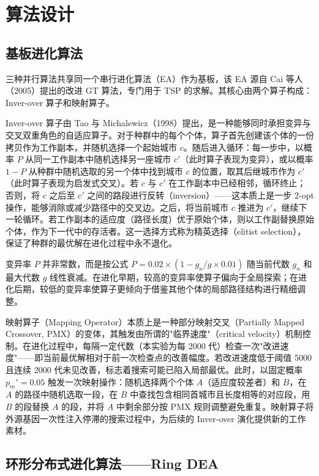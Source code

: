 \section{算法设计}

\subsection{基板进化算法}

三种并行算法共享同一个串行进化算法（EA）作为基板，该 EA 源自 Cai 等人（2005）提出的改进 GT 算法，专门用于 TSP 的求解。其核心由两个算子构成：Inver-over 算子和映射算子。

Inver-over 算子由 Tao 与 Michalewicz（1998）提出，是一种能够同时承担变异与交叉双重角色的自适应算子。对于种群中的每个个体，算子首先创建该个体的一份拷贝作为工作副本，并随机选择一个起始城市 $c$。随后进入循环：每一步中，以概率 $P$ 从同一工作副本中随机选择另一座城市 $c'$（此时算子表现为变异），或以概率 $1-P$ 从种群中随机选取的另一个体中找到城市 $c$ 的位置，取其后继城市作为 $c'$（此时算子表现为启发式交叉）。若 $c$ 与 $c'$ 在工作副本中已经相邻，循环终止；否则，将 $c$ 之后至 $c'$ 之间的路段进行反转（inversion）——这本质上是一步 2-opt 操作，能够消除或减少路径中的交叉边。之后，将当前城市 $c$ 推进为 $c'$，继续下一轮循环。若工作副本的适应度（路径长度）优于原始个体，则以工作副替换原始个体，作为下一代中的存活者。这一选择方式称为精英选择（elitist selection），保证了种群的最优解在进化过程中永不退化。

变异率 $P$ 并非常数，而是按公式 $P = 0.02 \times (1 - g_n / g \times 0.01)$ 随当前代数 $g_n$ 和最大代数 $g$ 线性衰减。在进化早期，较高的变异率使算子偏向于全局探索；在进化后期，较低的变异率使算子更倾向于借鉴其他个体的局部路径结构进行精细调整。

映射算子（Mapping Operator）本质上是一种部分映射交叉（Partially Mapped Crossover, PMX）的变体，其触发由所谓的"临界速度"（critical velocity）机制控制。在进化过程中，每隔一定代数（本实验为每 2000 代）检查一次"改进速度"——即当前最优解相对于前一次检查点的改善幅度。若改进速度低于阈值 5000 且连续 2000 代未见改善，标志着搜索可能已陷入局部最优。此时，以固定概率 $p_m' = 0.05$ 触发一次映射操作：随机选择两个个体 $A$（适应度较差者）和 $B$，在 $A$ 的路径中随机选取一段，在 $B$ 中查找包含相同首城市且长度相等的对应段，用 $B$ 的段替换 $A$ 的段，并将 $A$ 中剩余部分按 PMX 规则调整避免重复。映射算子将外源基因一次性注入停滞的搜索过程中，为后续的 Inver-over 演化提供新的工作素材。

\subsection{环形分布式进化算法——Ring DEA}


